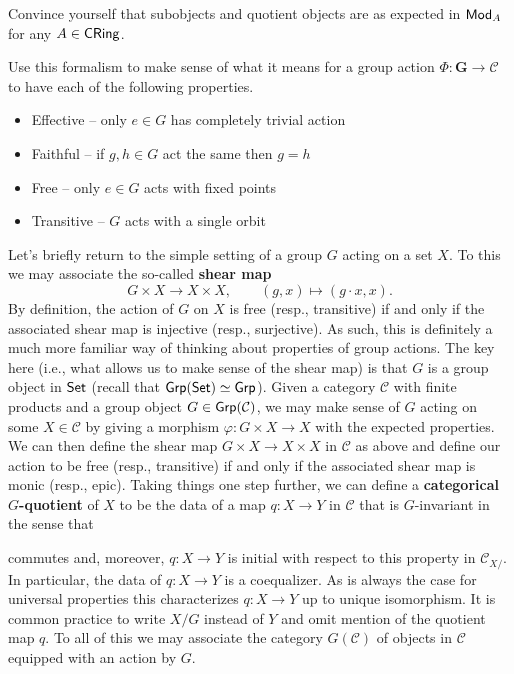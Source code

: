 \documentclass[11pt]{article}
\newcommand{\CC}{\mathcal{C}}
\renewcommand{\phi}{\varphi}
\begin{document}
\begin{exercise}
Convince yourself that subobjects and quotient objects are as expected in $\operatorname{\mathsf{Mod}}_A$ for any $A\in\operatorname{\mathsf{CRing}}$.
\end{exercise}

\begin{exercise}
Use this formalism to make sense of what it means for a group action $\Phi: \mathbf{G}\to\CC$ to have each of the following properties.
\begin{itemize}
\item Effective -- only $e\in G$ has completely trivial action

\item Faithful -- if $g,h\in G$ act the same then $g=h$

\item Free -- only $e\in G$ acts with fixed points

\item Transitive -- $G$ acts with a single orbit
\end{itemize}
\end{exercise}

Let's briefly return to the simple setting of a group $G$ acting on a set $X$. To this we may associate the so-called \textbf{shear map}
$$G\times X\to X\times X,\qquad (g,x)\mapsto(g\cdot x,x).$$
By definition, the action of $G$ on $X$ is free (resp., transitive) if and only if the associated shear map is injective (resp., surjective). As such, this is definitely a much more familiar way of thinking about properties of group actions. The key here (i.e., what allows us to make sense of the shear map) is that $G$ is a group object in $\operatorname{\mathsf{Set}}$ (recall that $\operatorname{\mathsf{Grp}}(\operatorname{\mathsf{Set}})\simeq\operatorname{\mathsf{Grp}}$). Given a category $\CC$ with finite products and a group object $G\in\Grp(\CC)$, we may make sense of $G$ acting on some $X\in\CC$ by giving a morphism $\phi: G\times X\to X$ with the expected properties. We can then define the shear map $G\times X\to X\times X$ in $\CC$ as above and define our action to be free (resp., transitive) if and only if the associated shear map is monic (resp., epic). Taking things one step further, we can define a \textbf{categorical $G$-quotient} of $X$ to be the data of a map $q: X\to Y$ in $\CC$ that is $G$-invariant in the sense that
\begin{center}
\end{center}
commutes and, moreover, $q: X\to Y$ is initial with respect to this property in $\CC_{X/}$. In particular, the data of $q: X\to Y$ is a coequalizer. As is always the case for universal properties this characterizes $q: X\to Y$ up to unique isomorphism. It is common practice to write $X/G$ instead of $Y$ and omit mention of the quotient map $q$. To all of this we may associate the category $G(\CC)$ of objects in $\CC$ equipped with an action by $G$.
\end{document}
